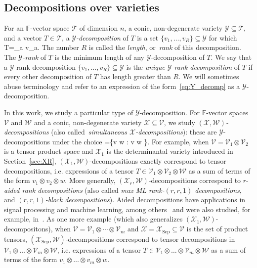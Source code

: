 \documentclass[11pt]{article}
\theoremstyle{definition}
\newcommand{\setft}[1]{\mathrm{#1}}
\newcommand{\field}{\mathbb{F}}
\newcommand\X{\mathcal{X}}
\newcommand\Y{\mathcal{Y}}
\newcommand\W{\mathcal{W}}
\newcommand\V{\mathcal{V}}
\newcommand\T{\mathcal{T}}
\def\ba#1\ea{\begin{align}#1\end{align}}
\begin{document}
\subsection{Decompositions over varieties}\label{sec:variety_decomp}

For an $\field$-vector space $\T$ of dimension $n$, a conic, non-degenerate variety $\Y \subseteq \T$, and a vector $T \in \T$, a \textit{$\Y$-decomposition} of $T$ is a set $\{v_1,\dots, v_R\} \subseteq \Y$ for which
\ba\label{eq:Y_decomp}
T=\sum_{a \in [R]} v_a.
\ea
The number $R$ is called the \textit{length}, or~\textit{rank} of this decomposition. The \textit{$\Y$-rank} of $T$ is the minimum length of any $\Y$-decomposition of $T$. We say that a $\Y$-rank decomposition $\{v_1,\dots, v_R\} \subseteq \Y$ is the \textit{unique $\Y$-rank decomposition} of $T$ if every other decomposition of $T$ has length greater than $R$. We will sometimes abuse terminology and refer to an expression of the form~\eqref{eq:Y_decomp} as a $\Y$-decomposition.

In this work, we study a particular type of $\Y$-decomposition. For $\field$-vector spaces $\V$ and $\W$ and a conic, non-degenerate variety $\X \subseteq \V$, we study \textit{$(\X,\W)$-decompositions} (also called~\textit{simultaneous $\X$-decompositions}): these are $\Y$-decompositions under the choice
\ba\label{eq:Y}
\Y=\{v \otimes w : v \in \X \quad {} \quad w \in \W\}\subseteq \V\otimes \W.
\ea
For example, when $\V=\V_1\otimes \V_2$ is a tensor product space and $\X_1$ is the determinantal variety introduced in Section~\ref{sec:XR}, $(\X_1,\W)$-decompositions exactly correspond to tensor decompositions, i.e. expressions of a tensor $T \in \V_1 \otimes \V_2 \otimes \W$ as a sum of terms of the form $v_1 \otimes v_2 \otimes w$. More generally, $(\X_r, \W)$-decompositions correspond to $r$-\textit{aided rank decompositions} (also called \textit{max ML rank-$(r,r,1)$ decompositions}, and \textit{$(r,r,1)$-block decompositions}). Aided decompositions have applications in signal processing and machine learning, among others~\cite{kolda2009tensor,comon2010handbook,cichocki2015tensor,sidiropoulos2017tensor} and were also studied, for example, in~\cite{de2008decompositionspart1,de2008decompositionspart2,de2008decompositionspart3,domanov2020uniqueness}. As one more example (which also generalizes $(\X_1,\W)$-decompositons), when $\V=\V_1\otimes \cdots \otimes \V_{m}$ and $\X=\X_{\setft{Sep}}\subseteq \V$ is the set of product tensors, $(\X_{\setft{Sep}},\W)$-decompositions correspond to tensor decompositions in $\V_1\otimes \dots \otimes \V_m \otimes \W$, i.e. expressions of a tensor $T \in \V_1\otimes \dots \otimes \V_m \otimes \W$ as a sum of terms of the form $v_1\otimes \dots \otimes v_m \otimes w$.
\end{document}
